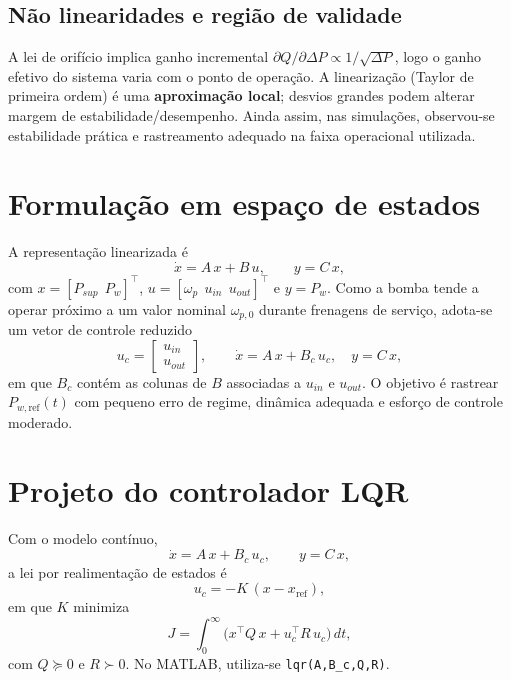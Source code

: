 \subsection{Não linearidades e região de validade}

A lei de orifício implica ganho incremental $\partial Q/\partial \Delta P \propto 1/\sqrt{\Delta P}$, logo o ganho efetivo do sistema varia com o ponto de operação. A linearização (Taylor de primeira ordem) é uma \textbf{aproximação local}; desvios grandes podem alterar margem de estabilidade/desempenho. Ainda assim, nas simulações, observou-se estabilidade prática e rastreamento adequado na faixa operacional utilizada.

\section{Formulação em espaço de estados}
\label{sec:controle-formulacao-espaço-estados}

A representação linearizada é
\[
    \dot{x} = A\,x + B\,u, \qquad y = C\,x,
\]
com $x=[P_{sup}\ \ P_w]^\top$, $u=[\omega_p\ \ u_{in}\ \ u_{out}]^\top$ e $y=P_w$. Como a bomba tende a operar próximo a um valor nominal $\omega_{p,0}$ durante frenagens de serviço, adota-se um vetor de controle reduzido
\[
    u_c =
    \begin{bmatrix}
        u_{in} \\ u_{out}
    \end{bmatrix},
    \qquad
    \dot{x} = A\,x + B_c\,u_c, \quad y=C\,x,
\]
em que $B_c$ contém as colunas de $B$ associadas a $u_{in}$ e $u_{out}$. O objetivo é rastrear $P_{w,\text{ref}}(t)$ com pequeno erro de regime, dinâmica adequada e esforço de controle moderado.

\section{Projeto do controlador LQR}
\label{sec:controle-lqr-luenberger}

Com o modelo contínuo,
\[
    \dot{x}=A\,x + B_c\,u_c,\qquad y=C\,x,
\]
a lei por realimentação de estados é
\[
    u_c = -K\,(x-x_{\text{ref}}),
\]
em que $K$ minimiza
\[
    J=\int_0^\infty \big(x^\top Q\,x + u_c^\top R\,u_c\big)\,dt,
\]
com $Q\succeq 0$ e $R\succ 0$. No MATLAB, utiliza-se \texttt{lqr(A,B\_c,Q,R)}.

